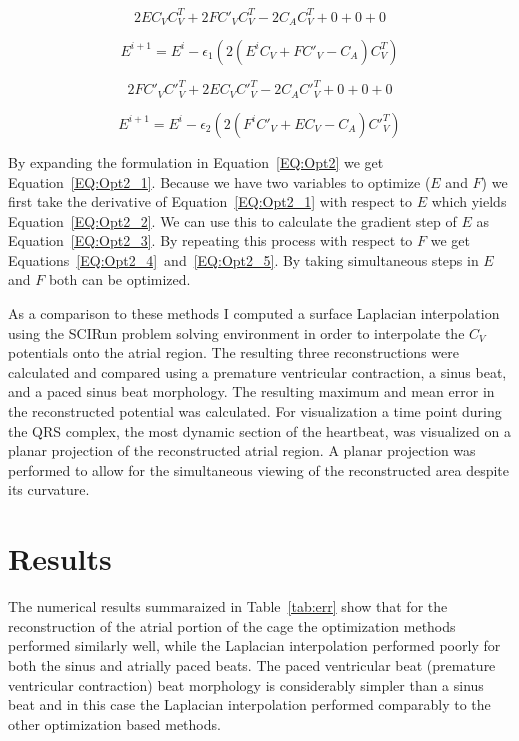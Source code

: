 \documentclass[12pt]{article}
\begin{document}
\begin{equation}
2EC_VC_V^T + 2FC'_VC_V^T - 2C_AC_V^T +0 +0 +0
\label{EQ:Opt2_2}
\end{equation}

\begin{equation}
E^{i+1} = E^i - \epsilon_1(2(E^iC_V + FC'_V - C_A)C_V^T)
\label{EQ:Opt2_3}
\end{equation}

\begin{equation}
2FC'_VC'_V^T + 2EC_VC'_V^T - 2C_AC'_V^T +0 +0 +0
\label{EQ:Opt2_4}
\end{equation}

\begin{equation}
E^{i+1} = E^i - \epsilon_2(2(F^iC'_V + EC_V - C_A)C'_V^T)
\label{EQ:Opt2_5}
\end{equation}

By expanding the formulation in Equation~\ref{EQ:Opt2} we get Equation~\ref{EQ:Opt2_1}. Because we have two variables to optimize ($E$ and $F$) we first take the derivative of Equation~\ref{EQ:Opt2_1} with respect to $E$ which yields Equation~\ref{EQ:Opt2_2}. We can use this to calculate the gradient step of $E$ as Equation~\ref{EQ:Opt2_3}. By repeating this process with respect to $F$ we get Equations~\ref{EQ:Opt2_4}~and~\ref{EQ:Opt2_5}. By taking simultaneous steps in $E$ and $F$ both can be optimized.

As a comparison to these methods I computed a surface Laplacian interpolation using the SCIRun problem solving environment in order to interpolate the $C_V$ potentials onto the atrial region. The resulting three reconstructions were calculated and compared using a premature ventricular contraction, a sinus beat, and a paced sinus beat morphology. The resulting maximum and mean error in the reconstructed potential was calculated. For visualization a time point during the QRS complex, the most dynamic section of the heartbeat, was visualized on a planar projection of the reconstructed atrial region. A planar projection was performed to allow for the simultaneous viewing of the reconstructed area despite its curvature.

\section{Results}

The numerical results summaraized in Table~\ref{tab:err} show that for the reconstruction of the atrial portion of the cage the optimization methods performed similarly well, while the Laplacian interpolation performed poorly for both the sinus and atrially paced beats. The paced ventricular beat (premature ventricular contraction) beat morphology is considerably simpler than a sinus beat and in this case the Laplacian interpolation performed comparably to the other optimization based methods.
\end{document}
